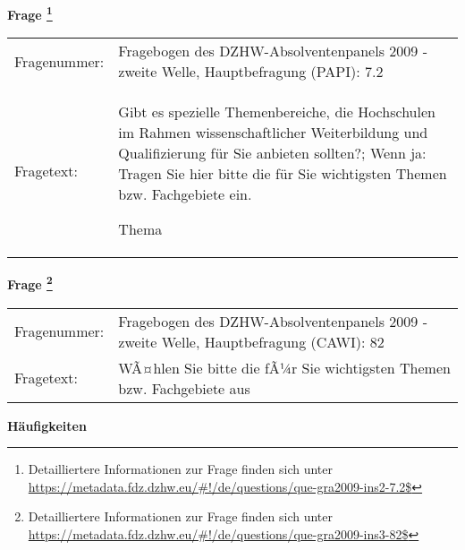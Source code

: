 				\vspace*{0.5cm}
                \noindent\textbf{Frage
	                \footnote{Detailliertere Informationen zur Frage finden sich unter
		              \url{https://metadata.fdz.dzhw.eu/\#!/de/questions/que-gra2009-ins2-7.2$}}}\\
				\begin{tabularx}{\hsize}{@{}lX}
					Fragenummer: &
					  Fragebogen des DZHW-Absolventenpanels 2009 - zweite Welle, Hauptbefragung (PAPI):
					  7.2
 \\
					Fragetext: & Gibt es spezielle Themenbereiche, die Hochschulen im Rahmen wissenschaftlicher Weiterbildung und Qualifizierung für Sie anbieten sollten?; Wenn ja: Tragen Sie hier bitte die für Sie wichtigsten Themen bzw. Fachgebiete ein.\par  Thema \\
				\end{tabularx}
				\vspace*{0.5cm}
                \noindent\textbf{Frage
	                \footnote{Detailliertere Informationen zur Frage finden sich unter
		              \url{https://metadata.fdz.dzhw.eu/\#!/de/questions/que-gra2009-ins3-82$}}}\\
				\begin{tabularx}{\hsize}{@{}lX}
					Fragenummer: &
					  Fragebogen des DZHW-Absolventenpanels 2009 - zweite Welle, Hauptbefragung (CAWI):
					  82
 \\
					Fragetext: & WÃ¤hlen Sie bitte die fÃ¼r Sie wichtigsten Themen bzw. Fachgebiete aus \\
				\end{tabularx}





        		\vspace*{0.5cm}
                \noindent\textbf{Häufigkeiten}

